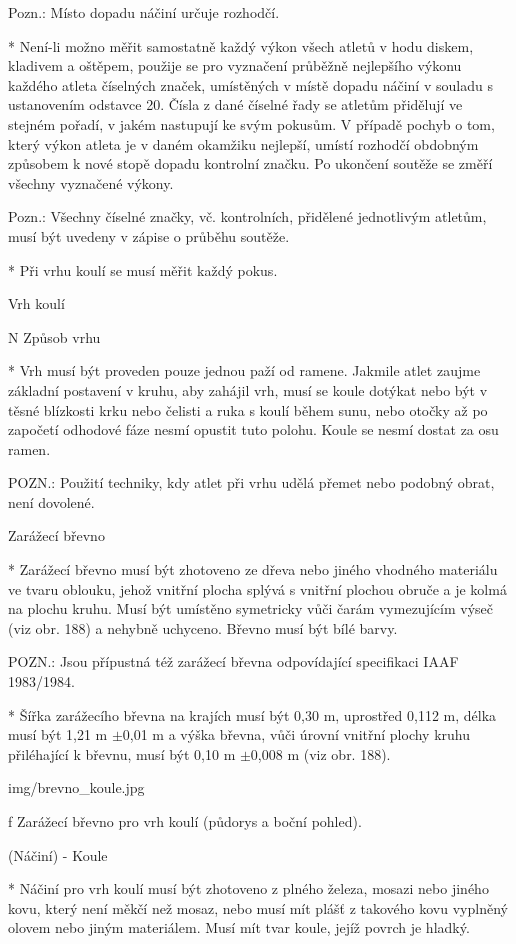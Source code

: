 Pozn.: Místo dopadu náčiní určuje rozhodčí.

* Není-li možno měřit samostatně každý výkon všech atletů v hodu diskem, kladivem a oštěpem, použije se pro vyznačení průběžně nejlepšího výkonu každého atleta číselných značek, umístěných v místě dopadu náčiní v souladu s ustanovením odstavce 20. Čísla z dané číselné řady se atletům přidělují ve stejném pořadí, v jakém nastupují ke svým pokusům. V případě pochyb o tom, který výkon atleta je v daném okamžiku nejlepší, umístí rozhodčí obdobným způsobem k nové stopě dopadu kontrolní značku. Po ukončení soutěže se změří všechny vyznačené výkony.

Pozn.: Všechny číselné značky, vč. kontrolních, přidělené jednotlivým atletům, musí být uvedeny v zápise o průběhu soutěže.

* Při vrhu koulí se musí měřit každý pokus.
\enditems

\secc Vrh koulí

\begitems \style N
Způsob vrhu

* Vrh musí být proveden pouze jednou paží od ramene. Jakmile atlet zaujme základní postavení v kruhu, aby zahájil vrh, musí se koule dotýkat nebo být v těsné blízkosti krku nebo čelisti a ruka s koulí během sunu, nebo otočky až po započetí odhodové fáze nesmí opustit tuto polohu. Koule se nesmí dostat za osu ramen.

POZN.: Použití techniky, kdy atlet při vrhu udělá přemet nebo podobný obrat, není dovolené.

Zarážecí břevno

* Zarážecí břevno musí být zhotoveno ze dřeva nebo jiného vhodného materiálu ve tvaru oblouku, jehož vnitřní plocha splývá s vnitřní plochou obruče a je kolmá na plochu kruhu. Musí být umístěno symetricky vůči čarám vymezujícím výseč (viz obr. 188) a nehybně uchyceno. Břevno musí být bílé barvy.

POZN.: Jsou přípustná též zarážecí břevna odpovídající specifikaci IAAF 1983/1984.

* Šířka zarážecího břevna na krajích musí být 0,30 m, uprostřed 0,112 m, délka musí být 1,21 m $\pm$0,01 m a výška břevna, vůči úrovní vnitřní plochy kruhu přiléhající k břevnu, musí být 0,10 m $\pm$0,008 m (viz obr. 188).

\picw=8cm \inspic img/brevno_koule.jpg
\caption/f Zarážecí břevno pro vrh koulí (půdorys a boční pohled).

(Náčiní) - Koule

* Náčiní pro vrh koulí musí být zhotoveno z plného železa, mosazi nebo jiného kovu, který není měkčí než mosaz, nebo musí mít plášť z takového kovu vyplněný olovem nebo jiným materiálem. Musí mít tvar koule, jejíž povrch je hladký.

